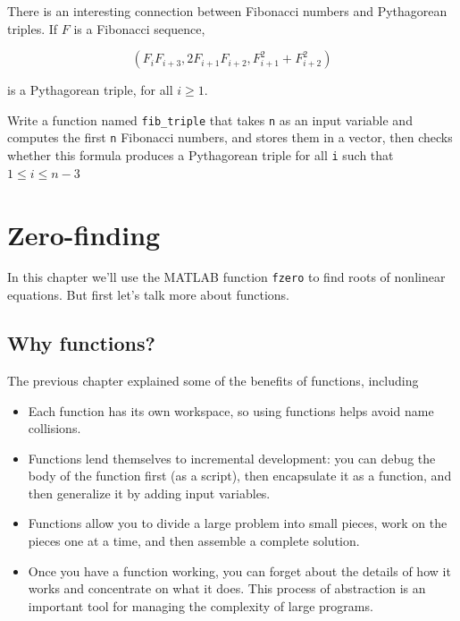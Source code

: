 \documentclass[
]{book}
\numberwithin{Answer}{chapter}
\numberwithin{Exercise}{chapter}
\begin{document}
\begin{ex}

There is an interesting connection between Fibonacci numbers and
Pythagorean triples.  If $F$ is a Fibonacci sequence,

\begin{equation}
(F_i F_{i+3}, 2 F_{i+1} F_{i+2}, F_{i+1}^2 + F_{i+2}^2 )
\end{equation}

is a Pythagorean triple, for all $i \ge 1$.

Write a function named {\tt fib\_triple} that
takes {\tt n} as an input variable and computes 
the first {\tt n} Fibonacci numbers, and stores them in a vector,
then checks whether this formula produces a Pythagorean triple for all {\tt i} such that $ 1 \leq i \leq n-3 $

\end{ex}



\chapter{Zero-finding}

In this chapter we'll use the MATLAB function {\tt fzero} to find roots of nonlinear equations.  But first let's talk more about functions.

\section{Why functions?}


The previous chapter explained some of the benefits of functions,
including

\begin{itemize}

\item Each function has its own workspace, so using functions helps
avoid name collisions.

\item Functions lend themselves to incremental development: you can
debug the body of the function first (as a script), then encapsulate
it as a function, and then generalize it by adding input variables.

\item Functions allow you to divide a large problem into small
pieces, work on the pieces one at a time, and then assemble a
complete solution.

\item Once you have a function working, you can forget about the
details of how it works and concentrate on what it does.  This
process of abstraction is an important tool for managing the
complexity of large programs.

\end{itemize}
\end{document}
